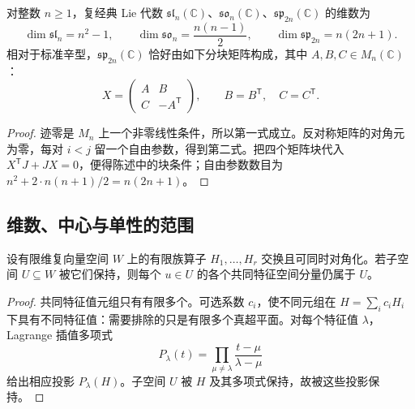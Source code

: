 \begin{proposition}\label{b5:prop:classical-dimensions}
	对整数 \(n\ge1\)，复经典 Lie 代数 \(\mathfrak{sl}_n(\mathbb C)\)、\(\mathfrak{so}_n(\mathbb C)\)、\(\mathfrak{sp}_{2n}(\mathbb C)\) 的维数为
	\[
		\dim\mathfrak{sl}_n=n^2-1,\qquad \dim\mathfrak{so}_n=\frac{n(n-1)}2,\qquad \dim\mathfrak{sp}_{2n}=n(2n+1).
	\]
	相对于标准辛型，\(\mathfrak{sp}_{2n}(\mathbb C)\) 恰好由如下分块矩阵构成，其中 \(A,B,C\in M_n(\mathbb C)\)：
	\[
		X=\begin{pmatrix}A&B\\C&-A^{\mathsf T}\end{pmatrix},
		\qquad B=B^{\mathsf T},\quad C=C^{\mathsf T}.
	\]
\end{proposition}
\begin{proof}
	迹零是 \(M_n\) 上一个非零线性条件，所以第一式成立。反对称矩阵的对角元为零，每对 \(i<j\) 留一个自由参数，得到第二式。把四个矩阵块代入 \(X^{\mathsf T}J+JX=0\)，便得陈述中的块条件；自由参数数目为 \(n^2+2\cdot n(n+1)/2=n(2n+1)\)。
\end{proof}

\subsection{维数、中心与单性的范围}
\label{b5:subsec:1304:02}

\begin{lemma}[提取共同权分量]\label{b5:lem:classical-weight-projection}
	设有限维复向量空间 \(W\) 上的有限族算子 \(H_1,\ldots,H_r\) 交换且可同时对角化。若子空间 \(U\subseteq W\) 被它们保持，则每个 \(u\in U\) 的各个共同特征空间分量仍属于 \(U\)。
\end{lemma}
\begin{proof}
	共同特征值元组只有有限多个。可选系数 \(c_i\)，使不同元组在 \(H=\sum_i c_iH_i\) 下具有不同特征值：需要排除的只是有限多个真超平面。对每个特征值 \(\lambda\)，Lagrange 插值多项式
	\[
		P_\lambda(t)=\prod_{\mu\ne\lambda}\frac{t-\mu}{\lambda-\mu}
	\]
	给出相应投影 \(P_\lambda(H)\)。子空间 \(U\) 被 \(H\) 及其多项式保持，故被这些投影保持。
\end{proof}

